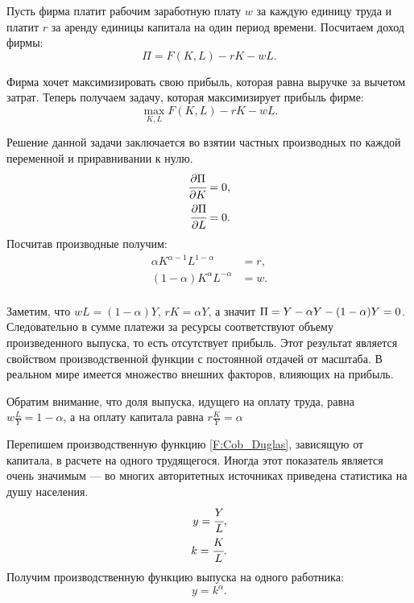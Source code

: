 Пусть фирма платит рабочим заработную плату $w$ за каждую единицу труда и платит $r$ за аренду единицы капитала на один период времени.
Посчитаем доход фирмы:
\begin{equation*}
	\Pi=F(K, L) - rK - wL\text{.}
\end{equation*}

Фирма хочет максимизировать свою прибыль, которая равна выручке за вычетом затрат.
Теперь получаем задачу, которая максимизирует прибыль фирме:
\begin{equation}
	\max\limits_{K, L} F(K,L) - rK - wL\text{.}
\end{equation}

Решение данной задачи заключается во взятии частных производных по каждой переменной и приравнивании к нулю.
\begin{align*}
	\cfrac{\partial \Pi}{\partial K} &= 0\text{,} \\
	\cfrac{\partial \Pi}{\partial L} &= 0\text{.}
\end{align*}
Посчитав производные получим:
\begin{align*}
	\alpha K^{\alpha - 1} L^{1-\alpha} &= r\text{,}\\
	(1 - \alpha) K^{\alpha} L^{-\alpha} &= w\text{.}\\
\end{align*}

Заметим, что $wL = (1-\alpha)Y$, $rK = \alpha Y$, а значит $\Pi=Y - \alpha Y - (1\hm{-} \alpha)Y = 0$.
Следовательно в сумме платежи за ресурсы соответствуют объему произведенного выпуска, то есть отсутствует прибыль.
Этот результат является свойством производственной функции с постоянной отдачей от масштаба.
В реальном мире имеется множество внешних факторов, влияющих на прибыль.

Обратим внимание, что доля выпуска, идущего на оплату труда, равна $w\frac{L}{Y} = 1 - \alpha$, а на оплату капитала равна $r\frac{K}{Y} = \alpha$

Перепишем производственную функцию \ref{F:Cob_Duglas}, зависящую от капитала, в расчете на одного трудящегося.
Иногда этот показатель является очень значимым --- во многих авторитетных источниках приведена статистика на душу населения.
\begin{align*}
y = \cfrac{Y}{L}\text{,}\\
k = \cfrac{K}{L}\text{.}
\end{align*}
Получим производственную функцию выпуска на одного работника:
\begin{equation}
	y = k^{\alpha}\text{.}
\label{F:proiz_per_worker}
\end{equation}

